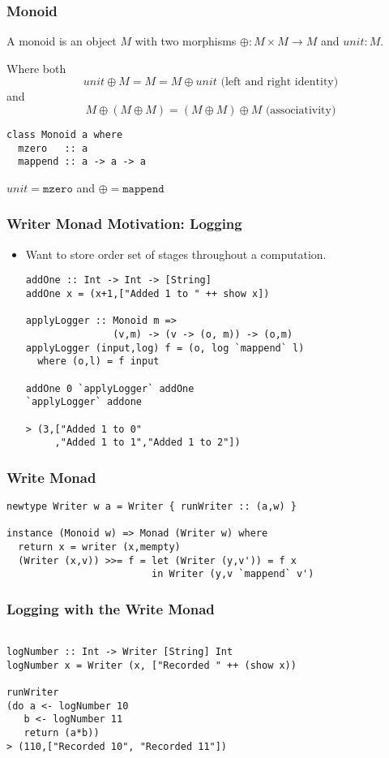 \documentclass{beamer} %
\begin{document}
\begin{frame}[fragile]\frametitle{Monoid}
    A monoid is an object $M$ with two morphisms $\oplus: M \times M \rightarrow M$ and $\mathit{unit} :M$.

    Where both \[\mathit{unit} \oplus M = M = M \oplus \mathit{unit} \text{ (left and right
        identity)}\] and
    \[ M \oplus (M \oplus M) = (M \oplus M)
      \oplus M \text{ (associativity)} \]

\begin{verbatim}
class Monoid a where
  mzero   :: a
  mappend :: a -> a -> a
\end{verbatim}
$\mathit{unit} = \texttt{mzero}$ and $\oplus = \texttt{mappend}$
\end{frame}

\begin{frame}[fragile]\frametitle{Writer Monad Motivation: Logging}
  \begin{itemize}
    \item Want to store order set of stages throughout a computation.
\begin{verbatim}
addOne :: Int -> Int -> [String]
addOne x = (x+1,["Added 1 to " ++ show x])

applyLogger :: Monoid m =>
               (v,m) -> (v -> (o, m)) -> (o,m)
applyLogger (input,log) f = (o, log `mappend` l)
  where (o,l) = f input

addOne 0 `applyLogger` addOne
`applyLogger` addone

> (3,["Added 1 to 0"
     ,"Added 1 to 1","Added 1 to 2"])
\end{verbatim}
  \end{itemize}
\end{frame}

\begin{frame}[fragile]\frametitle{Write Monad}
\begin{verbatim}
newtype Writer w a = Writer { runWriter :: (a,w) }

instance (Monoid w) => Monad (Writer w) where
  return x = writer (x,mempty)
  (Writer (x,v)) >>= f = let (Writer (y,v')) = f x
                         in Writer (y,v `mappend` v')
\end{verbatim}
\end{frame}

\begin{frame}[fragile]\frametitle{Logging with the Write Monad}
\begin{verbatim}

logNumber :: Int -> Writer [String] Int
logNumber x = Writer (x, ["Recorded " ++ (show x))

runWriter
(do a <- logNumber 10
   b <- logNumber 11
   return (a*b))
> (110,["Recorded 10", "Recorded 11"])
\end{verbatim}
\end{frame}
\end{document}
